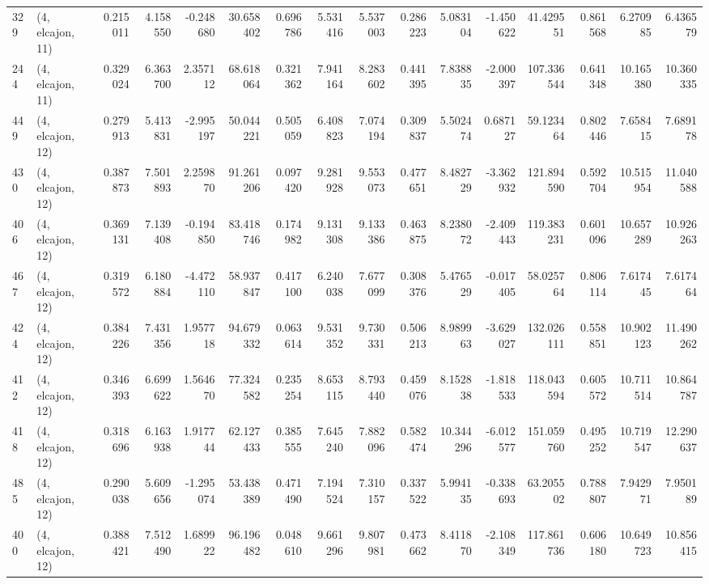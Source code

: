 \begin{tabular}{llrrrrrrrrrrrrrr}
329 &  (4, elcajon, 11) &   0.215011 &   4.158550 &  -0.248680 &    30.658402 &   0.696786 &   5.531416 &   5.537003 &  0.286223 &   5.083104 &  -1.450622 &    41.429551 &  0.861568 &   6.270985 &   6.436579 \\
244 &  (4, elcajon, 11) &   0.329024 &   6.363700 &   2.357112 &    68.618064 &   0.321362 &   7.941164 &   8.283602 &  0.441395 &   7.838835 &  -2.000397 &   107.336544 &  0.641348 &  10.165380 &  10.360335 \\
449 &  (4, elcajon, 12) &   0.279913 &   5.413831 &  -2.995197 &    50.044221 &   0.505059 &   6.408823 &   7.074194 &  0.309837 &   5.502474 &   0.687127 &    59.123464 &  0.802446 &   7.658415 &   7.689178 \\
430 &  (4, elcajon, 12) &   0.387873 &   7.501893 &   2.259870 &    91.261206 &   0.097420 &   9.281928 &   9.553073 &  0.477651 &   8.482729 &  -3.362932 &   121.894590 &  0.592704 &  10.515954 &  11.040588 \\
406 &  (4, elcajon, 12) &   0.369131 &   7.139408 &  -0.194850 &    83.418746 &   0.174982 &   9.131308 &   9.133386 &  0.463875 &   8.238072 &  -2.409443 &   119.383231 &  0.601096 &  10.657289 &  10.926263 \\
467 &  (4, elcajon, 12) &   0.319572 &   6.180884 &  -4.472110 &    58.937847 &   0.417100 &   6.240038 &   7.677099 &  0.308376 &   5.476529 &  -0.017405 &    58.025764 &  0.806114 &   7.617445 &   7.617464 \\
424 &  (4, elcajon, 12) &   0.384226 &   7.431356 &   1.957718 &    94.679332 &   0.063614 &   9.531352 &   9.730331 &  0.506213 &   8.989963 &  -3.629027 &   132.026111 &  0.558851 &  10.902123 &  11.490262 \\
412 &  (4, elcajon, 12) &   0.346393 &   6.699622 &   1.564670 &    77.324582 &   0.235254 &   8.653115 &   8.793440 &  0.459076 &   8.152838 &  -1.818533 &   118.043594 &  0.605572 &  10.711514 &  10.864787 \\
418 &  (4, elcajon, 12) &   0.318696 &   6.163938 &   1.917744 &    62.127433 &   0.385555 &   7.645240 &   7.882096 &  0.582474 &  10.344296 &  -6.012577 &   151.059760 &  0.495252 &  10.719547 &  12.290637 \\
485 &  (4, elcajon, 12) &   0.290038 &   5.609656 &  -1.295074 &    53.438389 &   0.471490 &   7.194524 &   7.310157 &  0.337522 &   5.994135 &  -0.338693 &    63.205502 &  0.788807 &   7.942971 &   7.950189 \\
400 &  (4, elcajon, 12) &   0.388421 &   7.512490 &   1.689922 &    96.196482 &   0.048610 &   9.661296 &   9.807981 &  0.473662 &   8.411870 &  -2.108349 &   117.861736 &  0.606180 &  10.649723 &  10.856415 \\

\end{tabular}
